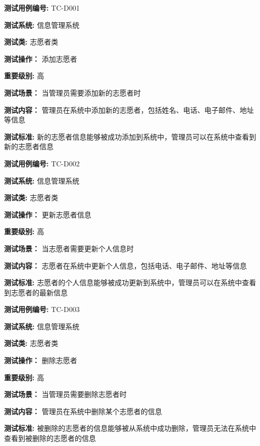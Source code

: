 \begin{framed} \textbf{测试用例编号:} TC-D001

\textbf{测试系统:} 信息管理系统

\textbf{测试类: } 志愿者类

\textbf{测试操作：} 添加志愿者

\textbf{重要级别:} 高

\textbf{测试场景：} 当管理员需要添加新的志愿者时

\textbf{测试内容：} 管理员在系统中添加新的志愿者，包括姓名、电话、电子邮件、地址等信息

\textbf{测试标准:} 新的志愿者信息能够被成功添加到系统中，管理员可以在系统中查看到新的志愿者信息

\begin{center}  \end{center} \end{framed}

\begin{framed} \textbf{测试用例编号:} TC-D002

\textbf{测试系统:} 信息管理系统

\textbf{测试类: } 志愿者类

\textbf{测试操作：} 更新志愿者信息

\textbf{重要级别:} 高

\textbf{测试场景：} 当志愿者需要更新个人信息时

\textbf{测试内容：} 志愿者在系统中更新个人信息，包括电话、电子邮件、地址等信息

\textbf{测试标准:} 志愿者的个人信息能够被成功更新到系统中，管理员可以在系统中查看到志愿者的最新信息

\begin{center}  \end{center} \end{framed}

\begin{framed} \textbf{测试用例编号:} TC-D003

\textbf{测试系统:} 信息管理系统

\textbf{测试类: } 志愿者类

\textbf{测试操作：} 删除志愿者

\textbf{重要级别:} 高

\textbf{测试场景：} 当管理员需要删除志愿者时

\textbf{测试内容：} 管理员在系统中删除某个志愿者的信息

\textbf{测试标准:} 被删除的志愿者的信息能够被从系统中成功删除，管理员无法在系统中查看到被删除的志愿者的信息

\begin{center}  \end{center} \end{framed}

